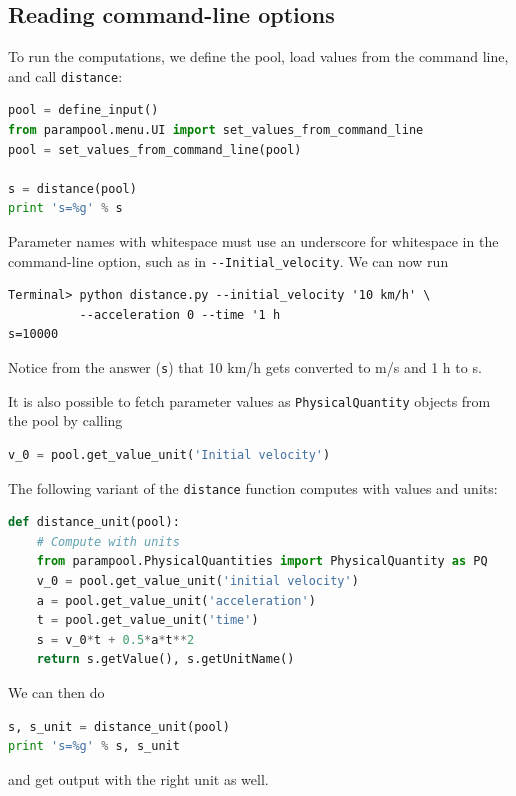 \documentclass[graybox,envcountchap,sectrefs,final]{svmonodo}
\begin{document}
\subsection{Reading command-line options}

To run the computations, we define the pool, load values from the
command line, and call \texttt{distance}:

\begin{lstlisting}[language=Python,style=graycolor]
pool = define_input()
from parampool.menu.UI import set_values_from_command_line
pool = set_values_from_command_line(pool)

s = distance(pool)
print 's=%g' % s
\end{lstlisting}

Parameter names with whitespace must use an underscore for whitespace
in the command-line option, such as in \Verb!--Initial_velocity!.
We can now run

\begin{Verbatim}[frame=lines,label=\fbox{{\tiny Terminal}},framesep=2.5mm,framerule=0.7pt,fontsize=\fontsize{9pt}{9pt}]
Terminal> python distance.py --initial_velocity '10 km/h' \ 
          --acceleration 0 --time '1 h
s=10000
\end{Verbatim}
Notice from the answer (\texttt{s}) that 10 km/h gets converted to m/s and 1 h to s.

It is also possible to fetch parameter values as \texttt{PhysicalQuantity}
objects from the pool by calling

\begin{lstlisting}[language=Python,style=graycolor]
v_0 = pool.get_value_unit('Initial velocity')
\end{lstlisting}
The following variant of the \texttt{distance} function computes with
values and units:

\begin{lstlisting}[language=Python,style=graycolor]
def distance_unit(pool):
    # Compute with units
    from parampool.PhysicalQuantities import PhysicalQuantity as PQ
    v_0 = pool.get_value_unit('initial velocity')
    a = pool.get_value_unit('acceleration')
    t = pool.get_value_unit('time')
    s = v_0*t + 0.5*a*t**2
    return s.getValue(), s.getUnitName()
\end{lstlisting}
We can then do

\begin{lstlisting}[language=Python,style=graycolor]
s, s_unit = distance_unit(pool)
print 's=%g' % s, s_unit
\end{lstlisting}
and get output with the right unit as well.
\end{document}
